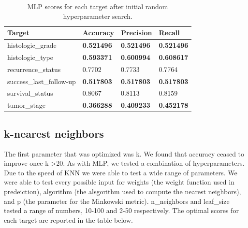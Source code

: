 \documentclass{article}
\begin{document}
\medskip
\begin{table}[H]
\begin{center}
\begin{tabular}{ *{4}{l} }
    \multicolumn{1}{p{1.5cm}}{\raggedright Target} &  
    \multicolumn{1}{p{1.5cm}}{\raggedright Accuracy} &  
    \multicolumn{1}{p{1.5cm}}{\raggedright Precision} &  
    \multicolumn{1}{p{1.5cm}}{\raggedright Recall} \\ \hline
histologic\_grade       &       \textbf{0.521496} &        \textbf{0.521496} &     \textbf{0.521496} \\
histologic\_type        &       \textbf{0.593371} &        \textbf{0.600994} &     \textbf{0.608617} \\
recurrence\_status      &         0.7702 &          0.7733 &       0.7764 \\
success\_last\_follow-up &       \textbf{0.517803} &        \textbf{0.517803} &     \textbf{0.517803} \\
survival\_status        &         0.8067 &          0.8113 &       0.8159 \\
tumor\_stage            &       \textbf{0.366288} &        \textbf{0.409233} &     \textbf{0.452178} \\
\end{tabular}
\caption{MLP scores for each target after initial random hyperparameter search.}
\end{center}
\end{table}

\subsection{k-nearest neighbors}

The first parameter that was optimized was k. We found that accuracy ceased to improve once k \textgreater  20. 
As with MLP, we tested a combination of hyperparameters. 
Due to the speed of KNN we were able to test a wide range of parameters. We were able to test every possible input for weights (the weight function used in predeiction), algorithm (the alsgorithm used to compute the nearest neighbors), and p (the parameter for the Minkowski metric). 
n\_neighbors and leaf\_size tested a range of numbers, 10-100 and 2-50 respectively.
The optimal scores for each target are reported in the table below.
\end{document}

